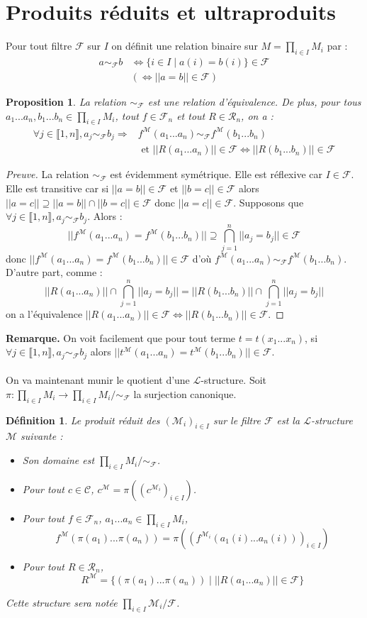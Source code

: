 \documentclass[11pt,a4paper]{report}
\newtheorem{defi}[theo]{Définition}
\newtheorem{prop}[theo]{Proposition}
\newcommand{\La}{\mathcal{L}}
\newcommand{\M}{\mathcal{M}}
\newcommand{\itemz}{\item[$\triangleright$]}
\newcommand{\F}{\mathcal{F}}
\newcommand{\gr}{\textbf}
\newcommand{\preuve}{\begin{proof}[Preuve]}
\newcommand{\cqfd}{\end{proof}}
\newcommand{\equi}{\Leftrightarrow}
\newcommand{\R}{\mathcal{R}}
\newcommand{\C}{\mathcal{C}}
\newcommand{\1}{\mathbbm{1}}
\begin{document}
\section{Produits réduits et ultraproduits}
Pour tout filtre $\F$ sur $I$ on définit une relation binaire sur $M = \prod_{i\in I} M_i$ par :
\begin{align*}
a \sim_\F b & \equi \{ i \in I \mid a(i) = b(i) \} \in \F \\
& (\equi || a = b || \in \F) \end{align*}
\begin{prop}
La relation $\sim_\F$ est une relation d'équivalence. De plus, pour tous $a_1...a_n,b_1...b_n \in \prod_{i\in I} M_i$, tout $f \in \F_n$ et tout $R \in \R_n$, on a :
\begin{align*}
\forall j \in \llbracket 1,n \rrbracket, a_j \sim_\F b_j \Rightarrow & f^\M (a_1...a_n) \sim_\F f^\M (b_1...b_n) \\ & \text{ et } ||R(a_1...a_n)|| \in \F \equi ||R(b_1...b_n)||\in \F
\end{align*}
\end{prop}
\preuve
La relation $\sim_\F$ est évidemment symétrique. Elle est réflexive car $I \in \F$. Elle est transitive car si $|| a = b || \in \F$ et $|| b = c || \in \F$ alors $ || a = c || \supseteq || a = b || \cap || b = c || \in \F$ donc $|| a = c || \in \F$. Supposons que $\forall j \in \llbracket 1,n \rrbracket, a_j \sim_\F b_j$. Alors :
\[ || f^\M(a_1...a_n) = f^\M(b_1...b_n) || \supseteq \bigcap_{j=1}^n || a_j = b_j || \in \F \]
donc $|| f^\M(a_1...a_n) = f^\M(b_1...b_n) || \in \F$ d'où $f^\M(a_1...a_n) \sim_\F f^\M(b_1...b_n)$. D'autre part, comme :
\[ || R(a_1...a_n) || \cap \bigcap_{j=1}^n || a_j = b_j || = || R(b_1...b_n) || \cap \bigcap_{j=1}^n || a_j = b_j || \]
on a l'équivalence $ || R(a_1...a_n) || \in \F \equi || R(b_1...b_n) || \in \F$.
\cqfd
\gr{Remarque.} On voit facilement que pour tout terme $t = t(x_1...x_n)$, si $\forall j \in \llbracket 1,n \rrbracket, a_j \sim_\F b_j$ alors $|| t^\M (a_1...a_n) = t^\M (b_1...b_n) || \in \F$.\\\\
On va maintenant munir le quotient d'une $\La$-structure. Soit $\pi : \prod_{i\in I} M_i \to \prod_{i\in I} M_i / \sim_\F$ la surjection canonique.
\begin{defi}
Le produit réduit des $(\M_i)_{i\in I}$ sur le filtre $\F$ est la $\La$-structure $\M$ suivante :
\begin{itemize}
\setlength\itemsep{-0.3em}
\itemz Son domaine est $\prod_{i\in I} M_i / \sim_\F$.
\itemz Pour tout $c \in \C$, $c^\M = \pi((c^{\M_i})_{i\in I})$.
\itemz Pour tout $f \in \F_n$, $a_1...a_n \in \prod_{i\in I} M_i$,
\[ f^\M(\pi(a_1)...\pi(a_n)) = \pi((f^{\M_i}(a_1(i)...a_n(i)))_{i\in I}) \]
\itemz Pour tout $R \in \R_n$,
\[ R^\M = \{ (\pi(a_1)...\pi(a_n)) \mid || R(a_1...a_n) || \in \F \} \]
\end{itemize}
Cette structure sera notée $\prod_{i\in I} \M_i / \F$.
\end{defi}
\end{document}
